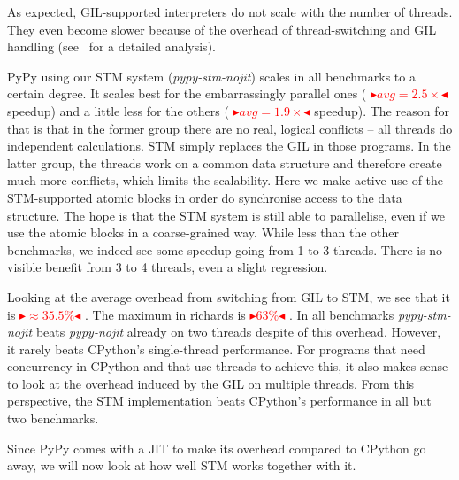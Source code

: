\documentclass{sigplanconf}
\newcommand{\mynote}[2]{%
  \textcolor{red}{%
    \fbox{\bfseries\sffamily\scriptsize#1}%
    {\small$\blacktriangleright$\textsf{\emph{#2}}$\blacktriangleleft$}%
  }%
}
\newcommand\remi[1]{\mynote{Remi}{#1}}
\begin{document}
As expected, GIL-supported interpreters do not scale with the number
of threads. They even become slower because of the overhead of
thread-switching and GIL handling (see~\cite{beazley10} for a detailed
analysis).

PyPy using our STM system (\emph{pypy-stm-nojit}) scales in all
benchmarks to a certain degree. It scales best for the embarrassingly
parallel ones (\remi{$avg=2.5\times$} speedup) and a little less for
the others (\remi{$avg=1.9\times$} speedup). The reason for that is
that in the former group there are no real, logical conflicts -- all
threads do independent calculations. STM simply replaces the GIL in
those programs. In the latter group, the threads work on a common data
structure and therefore create much more conflicts, which limits the
scalability. Here we make active use of the STM-supported atomic
blocks in order do synchronise access to the data structure. The hope
is that the STM system is still able to parallelise, even if we use
the atomic blocks in a coarse-grained way. While less than the other
benchmarks, we indeed see some speedup going from 1 to 3 threads.
There is no visible benefit from 3 to 4 threads, even a slight
regression.

Looking at the average overhead from switching from GIL to STM, we see
that it is \remi{$\approx 35.5\%$}. The maximum in richards is
\remi{$63\%$}. In all benchmarks \emph{pypy-stm-nojit} beats
\emph{pypy-nojit} already on two threads despite of this overhead.
However, it rarely beats CPython's single-thread performance.  For
programs that need concurrency in CPython and that use threads to
achieve this, it also makes sense to look at the overhead induced by
the GIL on multiple threads. From this perspective, the STM
implementation beats CPython's performance in all but two benchmarks.

Since PyPy comes with a JIT to make its overhead compared to CPython
go away, we will now look at how well STM works together with it.
\end{document}
